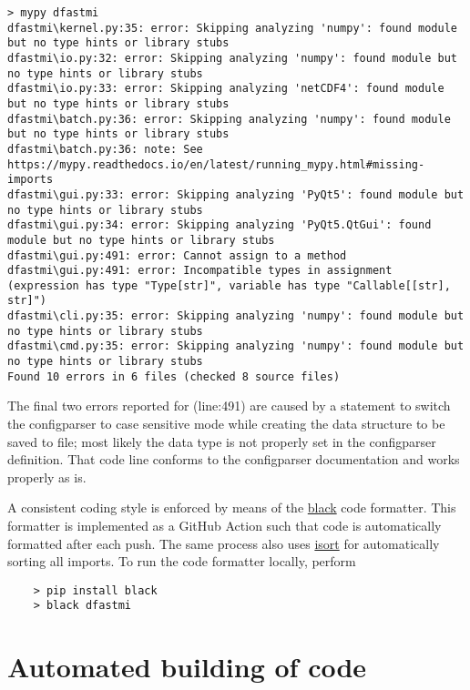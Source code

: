 \begin{Verbatim}[fontsize=\tiny]
> mypy dfastmi
dfastmi\kernel.py:35: error: Skipping analyzing 'numpy': found module but no type hints or library stubs
dfastmi\io.py:32: error: Skipping analyzing 'numpy': found module but no type hints or library stubs
dfastmi\io.py:33: error: Skipping analyzing 'netCDF4': found module but no type hints or library stubs
dfastmi\batch.py:36: error: Skipping analyzing 'numpy': found module but no type hints or library stubs
dfastmi\batch.py:36: note: See https://mypy.readthedocs.io/en/latest/running_mypy.html#missing-imports
dfastmi\gui.py:33: error: Skipping analyzing 'PyQt5': found module but no type hints or library stubs
dfastmi\gui.py:34: error: Skipping analyzing 'PyQt5.QtGui': found module but no type hints or library stubs
dfastmi\gui.py:491: error: Cannot assign to a method
dfastmi\gui.py:491: error: Incompatible types in assignment (expression has type "Type[str]", variable has type "Callable[[str], str]")
dfastmi\cli.py:35: error: Skipping analyzing 'numpy': found module but no type hints or library stubs
dfastmi\cmd.py:35: error: Skipping analyzing 'numpy': found module but no type hints or library stubs
Found 10 errors in 6 files (checked 8 source files)
\end{Verbatim}

The final two errors reported for  (line:491) are caused by a statement to switch the configparser to case sensitive mode while creating the data structure to be saved to file; most likely the data type is not properly set in the configparser definition.
That code line conforms to the configparser documentation and works properly as is.

A consistent coding style is enforced by means of the \href{https://pypi.org/project/black/}{black} code formatter.
This formatter is implemented as a GitHub Action such that code is automatically formatted after each push.
The same process also uses \href{https://pypi.org/project/isort/}{isort} for automatically sorting all imports.
To run the code formatter locally, perform 

\begin{Verbatim}
    > pip install black
    > black dfastmi
\end{Verbatim}

\section{Automated building of code} \label{Sec:AutoBuild}

